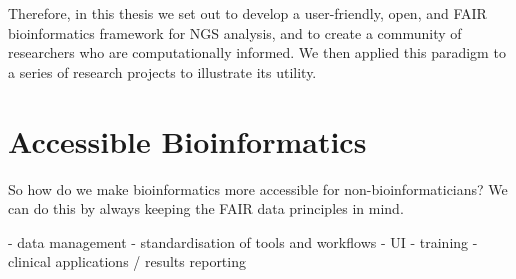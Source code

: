 Therefore, in this thesis we set out to develop a user-friendly, open, and FAIR bioinformatics framework for NGS analysis, and to create a community of researchers who are computationally informed. We then applied this paradigm to a series of research projects to illustrate its utility.





\section{Accessible Bioinformatics}

So how do we make bioinformatics more accessible for non-bioinformaticians?
We can do this by always keeping the FAIR data principles in mind.

- data management
- standardisation of tools and workflows
- UI
- training
- clinical applications / results reporting

